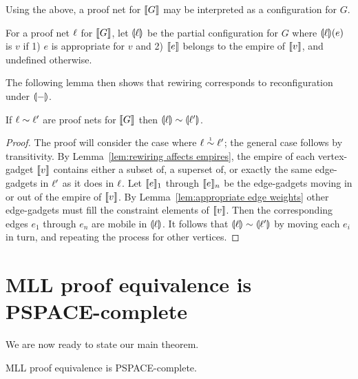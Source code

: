 \documentclass{sigplanconf}
\let\beforesection=\medskip
\let\aftersection=\noindent
\let\capsabbrev=\uppercase
\begin{document}
Using the above, a proof net for $\llbracket G\rrbracket$ may be interpreted as a configuration for $G$.



\begin{definition}
For a proof net $\ell$ for $\llbracket G\rrbracket$, let $\llparenthesis\ell\rrparenthesis$ be the partial configuration for $G$ where $\llparenthesis\ell\rrparenthesis(e)$ is $v$ if 1) $e$ is appropriate for $v$ and 2) $\llbracket e\rrbracket$ belongs to the empire of $\llbracket v\rrbracket$, and undefined otherwise.
\end{definition}


The following lemma then shows that rewiring corresponds to reconfiguration under $\llparenthesis-\rrparenthesis$.



\begin{lemma}
\label{lem:soundness}
If $\links\perm\links'$ are proof nets for $\llbracket G\rrbracket$ then $\coitn\links\perm\coitn{\links'}$.
\end{lemma}

\begin{proof}
The proof will consider the case where $\links\perm*\links'$; the general case follows by transitivity.
%
By Lemma~\ref{lem:rewiring affects empires}, the empire of each vertex-gadget $\llbracket v\rrbracket$ contains either a subset of, a superset of, or exactly the same edge-gadgets in $\ell'$ as it does in $\ell$.
%
Let $\llbracket e\rrbracket_1$ through $\llbracket e\rrbracket_n$ be the edge-gadgets moving in or out of the empire of $\llbracket v\rrbracket$.
%
By Lemma~\ref{lem:appropriate edge weights} other edge-gadgets must fill the constraint elements of $\llbracket v\rrbracket$.
%
Then the corresponding edges $e_1$ through $e_n$ are mobile in $\llparenthesis\ell\rrparenthesis$.
%
It follows that $\coitn\links\perm\coitn{\links'}$ by moving each $e_i$ in turn, and repeating the process for other vertices.
%
\end{proof}



\beforesection

\section{\capsabbrev{mll} proof equivalence is \capsabbrev{pspace}-complete}

\aftersection
%
We are now ready to state our main theorem.


\begin{theorem}
\capsabbrev{mll} proof equivalence is \capsabbrev{pspace}-complete.
\end{theorem}
\end{document}
